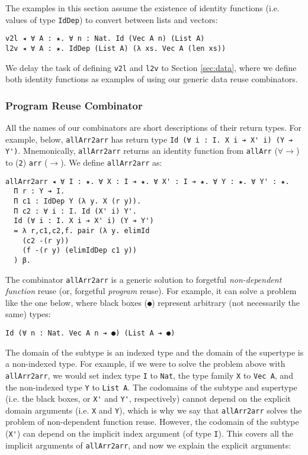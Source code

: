 \documentclass[acmsmall]{acmart}\settopmatter{}
\newcommand{\refsec}[1]{Section \ref{sec:#1}}
\begin{document}
The examples in this section assume the existence of
identity functions (i.e. values of type \verb;IdDep;)
to convert between lists and vectors:

\begin{verbatim}
v2l ◂ ∀ A : ★. ∀ n : Nat. Id (Vec A n) (List A)
l2v ◂ ∀ A : ★. IdDep (List A) (λ xs. Vec A (len xs))
\end{verbatim}
We delay the task of defining \verb;v2l; and \verb;l2v; to
\refsec{data}, where we define both identity functions as examples
of using our generic data reuse combinators.

\subsubsection{Program Reuse Combinator}

All the names of our combinators are short descriptions of their
return types. For example, below, \verb;allArr2arr; has return type
\verb;Id (∀ i : I. X i ➔ X' i) (Y ➔ Y');. Mnemonically,
\verb;allArr2arr; returns an identity function from \verb;allArr;
($\forall\rightarrow$) to (\verb;2;) \verb;arr; ($\rightarrow$).
We define \verb;allArr2arr; as:

\begin{verbatim}
allArr2arr ◂ ∀ I : ★. ∀ X : I ➔ ★. ∀ X' : I ➔ ★. ∀ Y : ★. ∀ Y' : ★.
  Π r : Y ➔ I.
  Π c1 : IdDep Y (λ y. X (r y)).
  Π c2 : ∀ i : I. Id (X' i) Y'.
  Id (∀ i : I. X i ➔ X' i) (Y ➔ Y')
  = λ r,c1,c2,f. pair (λ y. elimId 
    (c2 -(r y))
    (f -(r y) (elimIdDep c1 y))
  ) β.
\end{verbatim}
The combinator \verb;allArr2arr; is a generic solution to forgetful
\textit{non-dependent function} reuse (or, forgetful \textit{program} reuse). For
example, it can solve a problem like the one below, where black boxes
(\verb;●;) represent arbitrary (not necessarily the same) types:

\begin{verbatim}
Id (∀ n : Nat. Vec A n ➔ ●) (List A ➔ ●)
\end{verbatim}
The domain of the subtype is an indexed type
and the domain of the supertype is a non-indexed type.
For example, if
we were to solve the problem above with \verb;allArr2arr;, we would set
index type \verb;I; to \verb;Nat;, the type family \verb;X; to
\verb;Vec A;, and the non-indexed type \verb;Y; to \verb;List A;.
The codomains of the subtype and supertype
(i.e. the black boxes, or \verb;X'; and \verb;Y';, respectively)
cannot depend on the
explicit domain arguments (i.e. \verb;X; and \verb;Y;),
which is why we say that \verb;allArr2arr; solves the problem of
non-dependent function reuse.
However, the codomain of the subtype (\verb;X';)
can depend on the implicit index argument (of type \verb;I;).
This covers all the implicit arguments of \verb;allArr2arr;,
and now we explain the explicit arguments:
\end{document}
